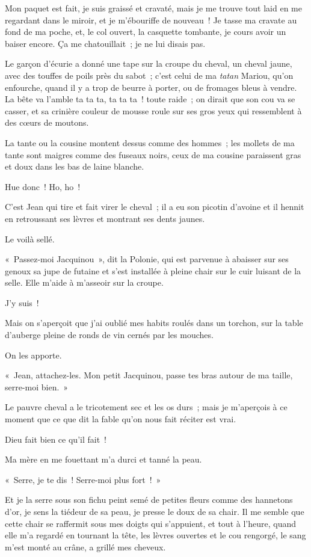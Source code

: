 \documentclass[french,twoside]{book} %
\begin{document}
Mon paquet est fait, je suis graissé et cravaté, mais je me trouve tout laid en me regardant dans le miroir, et je m’ébouriffe de nouveau ! Je tasse ma cravate au fond de ma poche, et, le col ouvert, la casquette tombante, je cours avoir un baiser encore. Ça me chatouillait ; je ne lui disais pas.\par
Le garçon d’écurie a donné une tape sur la croupe du cheval, un cheval jaune, avec des touffes de poils près du sabot ; c’est celui de ma \emph{tatan} Mariou, qu’on enfourche, quand il y a trop de beurre à porter, ou de fromages bleus à vendre. La bête va l’amble ta ta ta, ta ta ta ! toute raide ; on dirait que son cou va se casser, et sa crinière couleur de mousse roule sur ses gros yeux qui ressemblent à des cœurs de moutons.\par
La tante ou la cousine montent dessus comme des hommes ; les mollets de ma tante sont maigres comme des fuseaux noirs, ceux de ma cousine paraissent gras et doux dans les bas de laine blanche.\par
Hue donc ! Ho, ho !\par
C’est Jean qui tire et fait virer le cheval ; il a eu son picotin d’avoine et il hennit en retroussant ses lèvres et montrant ses dents jaunes.\par
Le voilà sellé.\par
« Passez-moi Jacquinou », dit la Polonie, qui est parvenue à abaisser sur ses genoux sa jupe de futaine et s’est installée à pleine chair sur le cuir luisant de la selle. Elle m’aide à m’asseoir sur la croupe.\par
\bigbreak
\noindent J’y suis !\par
Mais on s’aperçoit que j’ai oublié mes habits roulés dans un torchon, sur la table d’auberge pleine de ronds de vin cernés par les mouches.\par
On les apporte.\par
« Jean, attachez-les. Mon petit Jacquinou, passe tes bras autour de ma taille, serre-moi bien. »\par
Le pauvre cheval a le tricotement sec et les os durs ; mais je m’aperçois à ce moment que ce que dit la fable qu’on nous fait réciter est vrai.\par
Dieu fait bien ce qu’il fait !\par
Ma mère en me fouettant m’a durci et tanné la peau.\par
« Serre, je te dis ! Serre-moi plus fort ! »\par
Et je la serre sous son fichu peint semé de petites fleurs comme des hannetons d’or, je sens la tiédeur de sa peau, je presse le doux de sa chair. Il me semble que cette chair se raffermit sous mes doigts qui s’appuient, et tout à l’heure, quand elle m’a regardé en tournant la tête, les lèvres ouvertes et le cou rengorgé, le sang m’est monté au crâne, a grillé mes cheveux.\par
\end{document}
